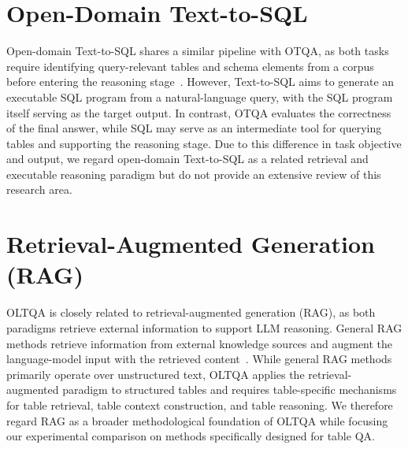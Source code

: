 \section{Open-Domain Text-to-SQL}
Open-domain Text-to-SQL shares a similar pipeline with OTQA, as both tasks require identifying query-relevant tables and schema elements from a corpus before entering the reasoning stage~\cite{text2sql}.
However, Text-to-SQL aims to generate an executable SQL program from a natural-language query, with the SQL program itself serving as the target output.
In contrast, OTQA evaluates the correctness of the final answer, while SQL may serve as an intermediate tool for querying tables and supporting the reasoning stage.
Due to this difference in task objective and output, we regard open-domain Text-to-SQL as a related retrieval and executable reasoning paradigm but do not provide an extensive review of this research area.

\section{Retrieval-Augmented Generation (RAG)}
OLTQA is closely related to retrieval-augmented generation (RAG), as both paradigms retrieve external information to support LLM reasoning.
General RAG methods retrieve information from external knowledge sources and augment the language-model input with the retrieved content~\cite{rag,atlas}.
While general RAG methods primarily operate over unstructured text, OLTQA applies the retrieval-augmented paradigm to structured tables and requires table-specific mechanisms for table retrieval, table context construction, and table reasoning.
We therefore regard RAG as a broader methodological foundation of OLTQA while focusing our experimental comparison on methods specifically designed for table QA.